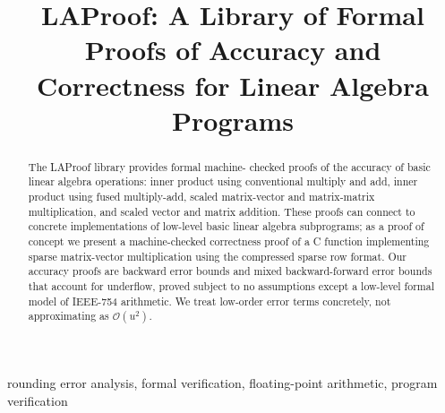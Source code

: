\documentclass[conference]{IEEEtran}
\begin{document}
\title{LAProof: A Library of Formal Proofs of Accuracy and
  Correctness for Linear Algebra Programs
}


\newcommand\comment[1]{}

\author{
}


\maketitle
\thispagestyle{plain}\pagestyle{plain} %

\begin{abstract}
The LAProof library provides formal machine-
checked proofs of the accuracy of basic linear algebra operations:
inner product using conventional multiply and add, inner product
using fused multiply-add, scaled matrix-vector and matrix-matrix
multiplication, and scaled vector and matrix addition. These
proofs can connect to concrete implementations of low-level basic
linear algebra subprograms; as a proof of concept we present a
machine-checked correctness proof of a C function implementing
sparse matrix-vector multiplication using the compressed sparse
row format. Our accuracy proofs are backward error bounds
and mixed backward-forward error bounds that account for
underflow, proved subject to no assumptions except a low-level
formal model of IEEE-754 arithmetic. We treat low-order error
terms concretely, not approximating as $\mathcal{O}(u^2)$.
\end{abstract}

\begin{IEEEkeywords}
rounding error analysis, formal verification,
floating-point arithmetic, program verification
\end{IEEEkeywords}
\end{document}

